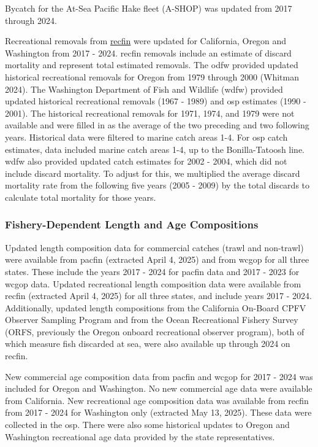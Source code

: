 \documentclass[
  english,
]{article}
\begin{document}
Bycatch for the At-Sea Pacific Hake fleet (A-SHOP) was updated from 2017
through 2024.

Recreational removals from \href{www.recfin.org}{\gls{recfin}} were
updated for California, Oregon and Washington from 2017 - 2024.
\gls{recfin} removals include an estimate of discard mortality and
represent total estimated removals. The \gls{odfw} provided updated
historical recreational removals for Oregon from 1979 through 2000
(Whitman 2024). The Washington Department of Fish and Wildlife
(\gls{wdfw}) provided updated historical recreational removals (1967 -
1989) and \gls{osp} estimates (1990 - 2001). The historical recreational
removals for 1971, 1974, and 1979 were not available and were filled in
as the average of the two preceding and two following years. Historical
data were filtered to marine catch areas 1-4. For \gls{osp} catch
estimates, data included marine catch areas 1-4, up to the
Bonilla-Tatoosh line. \gls{wdfw} also provided updated catch estimates
for 2002 - 2004, which did not include discard mortality. To adjust for
this, we multiplied the average discard mortality rate from the
following five years (2005 - 2009) by the total discards to calculate
total mortality for those years.

\subsubsection{Fishery-Dependent Length and Age
Compositions}\label{sec-fd_comps}

Updated length composition data for commercial catches (trawl and
non-trawl) were available from \gls{pacfin} (extracted April 4, 2025)
and from \gls{wcgop} for all three states. These include the years 2017
- 2024 for \gls{pacfin} data and 2017 - 2023 for \gls{wcgop} data.
Updated recreational length composition data were available from
\gls{recfin} (extracted April 4, 2025) for all three states, and include
years 2017 - 2024. Additionally, updated length compositions from the
California On-Board CPFV Observer Sampling Program and from the Ocean
Recreational Fishery Survey (ORFS, previously the Oregon onboard
recreational observer program), both of which measure fish discarded at
sea, were also available up through 2024 on \gls{recfin}.

New commercial age composition data from \gls{pacfin} and \gls{wcgop}
for 2017 - 2024 was included for Oregon and Washington. No new
commercial age data were available from California. New recreational age
composition data was available from \gls{recfin} from 2017 - 2024 for
Washington only (extracted May 13, 2025). These data were collected in
the \gls{osp}. There were also some historical updates to Oregon and
Washington recreational age data provided by the state representatives.
\end{document}
